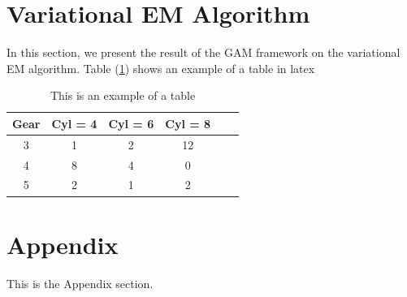 \documentclass[11pt]{article}
\begin{document}
	\section{Variational EM Algorithm} \label{variational}
	In this section, we present the result of the GAM framework on the variational EM algorithm.
	Table (\ref{tab:exampletab}) shows an example of a table in latex
	\begin{table}[!ht]
		\centering
		\begin{tabular}{|c|c|c|c|c|c|}
			\hline
			Gear & Cyl = 4 & Cyl = 6 & Cyl = 8\\
			\hline
			3 & 1 &  2 & 12 \\
			4 & 8 & 4  & 0 \\
			5 & 2 & 1 & 2 \\
			\hline
		\end{tabular}
		\caption{This is an example of a table}
		\label{tab:exampletab}
	\end{table}
	\section*{Appendix}
	This is the Appendix section.
	
	
    
\end{document}
